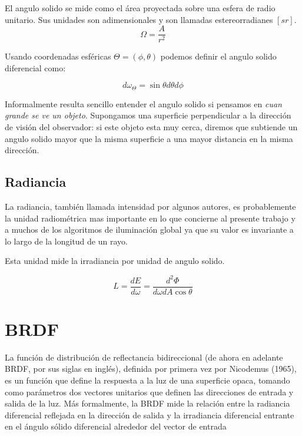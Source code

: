El angulo solido se mide como el área proyectada sobre una esfera de radio unitario. Sus unidades son adimensionales y son llamadas estereorradianes $[sr]$.
\begin{equation}
\Omega = \frac{A}{r^2}
\end{equation}


Usando coordenadas esféricas $\Theta = (\phi , \theta )$ podemos definir el angulo solido diferencial como:

\begin{equation}
d \omega _ \Theta = \sin \theta d \theta d \phi
\end{equation}

Informalmente resulta sencillo entender el angulo solido si pensamos en \emph{cuan grande se ve un objeto}. Supongamos una superficie perpendicular a la dirección de visión del observador: si este objeto esta muy cerca, diremos que subtiende un angulo solido mayor que la misma superficie a una mayor distancia en la misma dirección.

\clearpage

\subsection{Radiancia}

La radiancia, también llamada intensidad por algunos autores, es probablemente la unidad radiométrica mas importante en lo que concierne al presente trabajo y a muchos de los algoritmos de iluminación global ya que su valor es invariante a lo largo de la longitud de un rayo.

Esta unidad mide la irradiancia por unidad de angulo solido.

\begin{equation}
L = \frac{dE}{d\omega} = \frac{d^2\Phi}{d\omega dA\cos \theta} 
\end{equation}


\clearpage

\section{BRDF}

La función de distribución de reflectancia bidireccional (de ahora en adelante BRDF, por sus siglas en inglés), definida por primera vez por \cite{Nicodemus1965} Nicodemus (1965), es un función que define la respuesta a la luz de una superficie opaca, tomando como parámetros dos vectores unitarios que definen las direcciones de entrada y salida de la luz. Más formalmente, la BRDF mide la relación entre la radiancia diferencial reflejada en la dirección de salida y la irradiancia diferencial entrante en el ángulo sólido diferencial alrededor del vector de entrada

